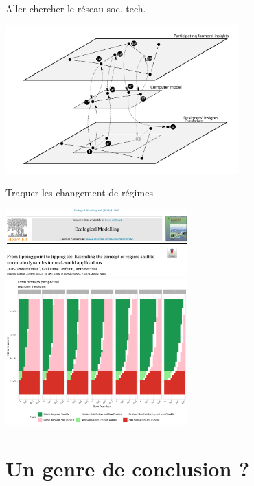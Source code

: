 \documentclass[newPxFont]{beamer}
\begin{document}
\begin{frame}[c]{Aller chercher le réseau soc. tech.}
  \vspace{-1cm}
\begin{center}
  \includegraphics[width=9cm]{img/fig-construction-elements-jeu-beneficiaire_eng}
\end{center}
\end{frame}


\begin{frame}[c]{Traquer les changement de régimes}
  \vspace{-1cm}
  \begin{center}
    \includegraphics[width=7cm]{img/2024mathias.png}\\
    \includegraphics[width=7cm]{img/m0_pse_fatisfaction_mathias_biomass.png}
   \end{center}
\end{frame}


\section{Un genre de conclusion ?}
\end{document}
